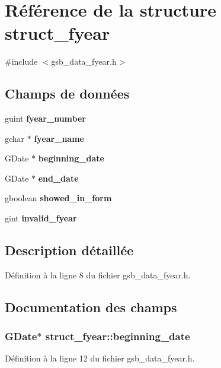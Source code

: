 \section{Référence de la structure struct\_\-fyear}
\label{structstruct__fyear}


{\ttfamily \#include $<$gsb\_\-data\_\-fyear.h$>$}

\subsection*{Champs de données}
\begin{DoxyCompactItemize}
\item 
guint {\bf fyear\_\-number}
\item 
gchar $\ast$ {\bf fyear\_\-name}
\item 
GDate $\ast$ {\bf beginning\_\-date}
\item 
GDate $\ast$ {\bf end\_\-date}
\item 
gboolean {\bf showed\_\-in\_\-form}
\item 
gint {\bf invalid\_\-fyear}
\end{DoxyCompactItemize}


\subsection{Description détaillée}


Définition à la ligne 8 du fichier gsb\_\-data\_\-fyear.h.



\subsection{Documentation des champs}
\subsubsection[{beginning\_\-date}]{\setlength{\rightskip}{0pt plus 5cm}GDate$\ast$ {\bf struct\_\-fyear::beginning\_\-date}}\label{structstruct__fyear_ad246f3b3485e02ea8d67454fd84e1536}


Définition à la ligne 12 du fichier gsb\_\-data\_\-fyear.h.

